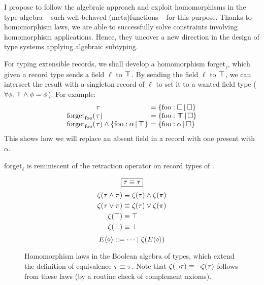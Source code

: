I propose to follow the algebraic approach and exploit homomorphisms in the type algebra -- such well-behaved (meta)functions -- for this purpose. Thanks to homomorphism laws, we are able to successfully solve constraints involving homomorphism applications. Hence, they uncover a new direction in the design of type systems applying algebraic subtyping.

\begin{example}
    For typing extensible records, we shall develop a homomorphism $\mathrm{forget}_\ell$, which given a record type sends a field $\ell$ to $\top \!\!\!\! \top$.
    By sending the field $\ell$ to $\top \!\!\!\! \top$, we can intersect the result with a singleton record of $\ell$ to set it to a wanted field type ($\forall \phi \ldotp \top \!\!\!\! \top \land \phi = \phi$). 
    For example:
    \setlength{\tabcolsep}{0pt}
    $$\begin{array}{rll}
        &\hspace{-0.9em}\tau &\;\hspace{-0.9em}= \flext{\mathrm{foo}: \flabsent}{\flabsent} \\
        \mathrm{forget}_\mathrm{foo}( &\hspace{-0.9em}\tau ) &\;\hspace{-0.9em}= \flext{\mathrm{foo}: \flftop}{\flabsent} \\
        \mathrm{forget}_\mathrm{foo}( &\hspace{-0.9em}\tau ) \meet \flext{\mathrm{foo}: \alpha}{\flftop} &\;\hspace{-0.9em}= \flext{\mathrm{foo}: \alpha}{\flabsent}
    \end{array}$$
    This shows how we will replace an absent field in a record with one present with $\alpha$.

    $\mathrm{forget}_\ell$ is reminiscent of the retraction operator on record types of \textcite{operations-on-records}.
\end{example}

\begin{figure}
    \centering
    $$\boxed{\tau \equiv \tau}$$
    \vspace{-2em}
    \begin{align*}
        \zeta(\tau \land \pi) &\equiv \zeta(\tau) \land \zeta(\pi) \\
        \zeta(\tau \lor \pi) &\equiv \zeta(\tau) \lor \zeta(\pi) \\
        \zeta(\top) &\equiv \top \\
        \zeta(\bot) &\equiv \bot
    \end{align*}
    \vspace{-1em}
    $$ \equivctx ::= \cdots \mid \morph(\equivctx) $$
    \caption{Homomorphism laws in the Boolean algebra of types, which extend the definition of equivalence $\tau \equiv \tau$. Note that $\zeta(\lnot \tau) \equiv \lnot \zeta(\tau)$ follows from these laws (by a routine check of complement axioms).}
    \label{fig:morphism-laws}
\end{figure}

